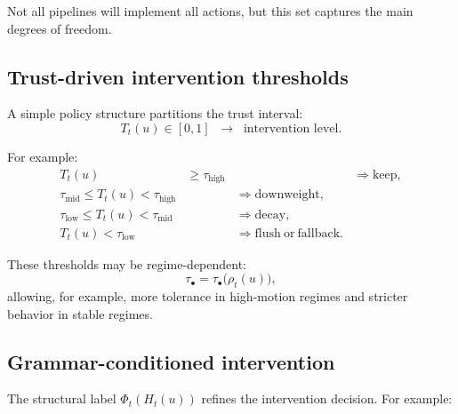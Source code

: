 \documentclass[11pt]{article}
\theoremstyle{definition}
\theoremstyle{plain}
\begin{document}
Not all pipelines will implement all actions, but this set captures the main degrees of freedom.


\subsection{Trust-driven intervention thresholds}

A simple policy structure partitions the trust interval:
\begin{equation}
T_t(u)\in[0,1]
\;\;\longrightarrow\;\;
\text{intervention level}.
\end{equation}

For example:
\begin{align}
T_t(u) &\ge \tau_{\mathrm{high}} &&\Rightarrow \mathrm{keep},\\
\tau_{\mathrm{mid}} \le T_t(u) < \tau_{\mathrm{high}} &&\Rightarrow \mathrm{downweight},\\
\tau_{\mathrm{low}} \le T_t(u) < \tau_{\mathrm{mid}} &&\Rightarrow \mathrm{decay},\\
T_t(u) < \tau_{\mathrm{low}} &&\Rightarrow \mathrm{flush\ or\ fallback}.
\end{align}

These thresholds may be regime-dependent:
\begin{equation}
\tau_{\bullet}=\tau_{\bullet}\bigl(\rho_t(u)\bigr),
\end{equation}
allowing, for example, more tolerance in high-motion regimes and stricter behavior in stable regimes.


\subsection{Grammar-conditioned intervention}

The structural label $\Phi_t(H_t(u))$ refines the intervention decision. For example:
\end{document}
